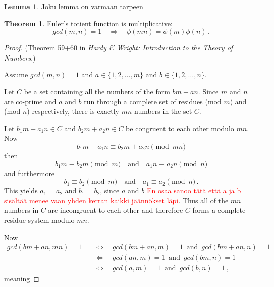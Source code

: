 \documentclass{article}
\theoremstyle{definition}
\newtheorem{lemma}[subsubsection]{Lemma}
\newtheorem{theorem}[subsection]{Theorem}
\begin{document}
\begin{lemma}
Joku lemma on varmaan tarpeen
\end{lemma}

\begin{theorem}
Euler's totient function is multiplicative:
\begin{equation*}
    gcd(m,n)=1 \quad\Rightarrow\quad \phi(mn)=\phi(m)\phi(n)\,.
\end{equation*}

\begin{proof}

(Theorem 59+60 in \textit{Hardy \& Wright: Introduction to the Theory of Numbers}.)

Assume $gcd(m,n)=1$ and $a\in\{1,2,\dots,m\}$ and $b\in\{1,2,\dots,n\}$.


Let $C$ be a set containing all the numbers of the form $bm+an$. Since $m$ and $n$ are co-prime and $a$ and $b$ run through a complete set of residues (mod $m$) and (mod $n$) respectively, there is exactly $mn$ numbers in the set $C$.

Let $b_1m+a_1n \in C$ and $b_2m+a_2n \in C$ be congruent to each other modulo $mn$. Now
\begin{equation*}
    b_1m+a_1n \equiv b_2m+a_2n \pmod{mn}
\end{equation*}
then
\begin{equation*}
    b_1m \equiv b_2m \pmod{m} \quad \text{and} \quad a_1n \equiv a_2n \pmod{n}
\end{equation*}
and furthermore
\begin{equation*}
    b_1 \equiv b_2 \pmod{m} \quad \text{and} \quad a_1 \equiv a_2 \pmod{n}\,.
\end{equation*}
This yields $a_1 = a_2$ and $b_1 = b_2$, since $a$ and $b$ \textcolor{red}{En osaa sanoo tätä että a ja b sisältää menee vaan yhden kerran kaikki jäännökset läpi}.
Thus all of the $mn$ numbers in $C$ are incongruent to each other and therefore $C$ forms a complete residue system modulo $mn$.

Now
\begin{align*}
    gcd(bm+an,mn)=1 \quad & \Leftrightarrow \quad gcd(bm+an,m)=1\, \text{ and } \,gcd(bm+an,n)=1\\
    & \Leftrightarrow \quad gcd(an,m)=1\, \text{ and } \,gcd(bm,n)=1\\
    & \Leftrightarrow \quad gcd(a,m)=1\, \text{ and } \,gcd(b,n)=1\,,
\end{align*}
meaning 


\end{proof}
\end{theorem}
\end{document}
